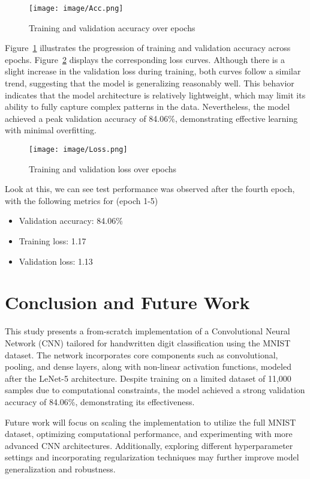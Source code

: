 \documentclass[conference]{IEEEtran}
\begin{document}
\begin{figure}[htbp]
    \centering
    \texttt{[image: image/Acc.png]}
    \caption{Training and validation accuracy over epochs}
    \label{fig:acc}
\end{figure}

Figure~\ref{fig:acc} illustrates the progression of training and validation accuracy across epochs. Figure~\ref{fig:loss} displays the corresponding loss curves. Although there is a slight increase in the validation loss during training, both curves follow a similar trend, suggesting that the model is generalizing reasonably well. This behavior indicates that the model architecture is relatively lightweight, which may limit its ability to fully capture complex patterns in the data. Nevertheless, the model achieved a peak validation accuracy of 84.06\%, demonstrating effective learning with minimal overfitting.

\begin{figure}[htbp]
    \centering
    \texttt{[image: image/Loss.png]}
    \caption{Training and validation loss over epochs}
    \label{fig:loss}
\end{figure}

Look at this, we can see test performance was observed after the fourth epoch, with the following metrics for (epoch 1-5)
\begin{itemize}
\item Validation accuracy: 84.06\%
\item Training loss: 1.17
\item Validation loss: 1.13
\end{itemize}

\section{Conclusion and Future Work}
This study presents a from-scratch implementation of a Convolutional Neural Network (CNN) tailored for handwritten digit classification using the MNIST dataset. The network incorporates core components such as convolutional, pooling, and dense layers, along with non-linear activation functions, modeled after the LeNet-5 architecture. Despite training on a limited dataset of 11,000 samples due to computational constraints, the model achieved a strong validation accuracy of 84.06\%, demonstrating its effectiveness.

Future work will focus on scaling the implementation to utilize the full MNIST dataset, optimizing computational performance, and experimenting with more advanced CNN architectures. Additionally, exploring different hyperparameter settings and incorporating regularization techniques may further improve model generalization and robustness.
\end{document}
